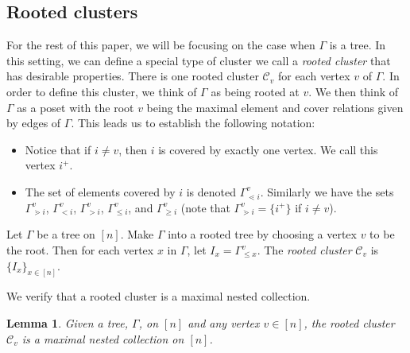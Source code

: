 \documentclass[pdftex]{sigma}
\numberwithin{equation}{section}
\newtheorem{Lemma}[Theorem]{Lemma}
\newcommand{\calC}{\mathcal{C}}
\begin{document}
\subsection{Rooted clusters}\label{sec:rooted-clusters}
For the rest of this paper, we will be focusing on the case when $\Gamma$ is a tree. In this setting, we can define a special type of cluster we call a \emph{rooted cluster} that has desirable properties. There is one rooted cluster $\calC_v$ for each vertex $v$ of $\Gamma$. In order to define this cluster, we think of $\Gamma$ as being rooted at $v$. We then think of $\Gamma$ as a poset with the root $v$ being the maximal element and cover relations given by edges of $\Gamma$. This leads us to establish the following notation:
\begin{itemize}\itemsep=0pt
 \item Notice that if $i\neq v$, then $i$ is covered by exactly one vertex. We call this vertex $i^+$.
 \item The set of elements covered by $i$ is denoted $\Gamma_{\lessdot i}^v$. Similarly we have the sets $\Gamma_{\gtrdot i}^v$, $\Gamma_{< i}^v$, $\Gamma_{> i}^v$, $\Gamma_{\leq i}^v$, and $\Gamma_{\geq i}^v$ (note that $\Gamma_{\gtrdot i}^v=\{i^+\}$ if $i\neq v$).
\end{itemize}
\begin{Definition}\label{defn:rooted-cluster}
Let $\Gamma$ be a tree on $[n]$. Make $\Gamma$ into a rooted tree by choosing a vertex $v$ to be the root. Then for each vertex $x$ in $\Gamma$, let $I_x=\Gamma_{\leq x}^v$. The \emph{rooted cluster} $\calC_v$ is $\{I_x\}_{x\in[n]}$.
\end{Definition}
We verify that a rooted cluster is a maximal nested collection.
\begin{Lemma}
Given a tree, $\Gamma$, on $[n]$ and any vertex $v \in [n]$, the rooted cluster $\calC_v$ is a maximal nested collection on $[n]$.
\end{Lemma}
\end{document}
